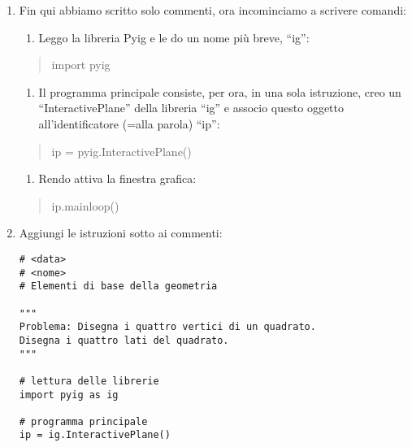 \begin{enumerate} [noitemsep]
A questo punto il programma assomiglierà a:

\begin{lstlisting}
# <data>
# <autore>
# Elementi di base della geometria

"""
Problema: Disegna i quattro vertici di un quadrato.
Disegna i quattro lati del quadrato.
"""

# lettura delle librerie

# programma principale

# attivazione della finestra grafica
\end{lstlisting}

\item Fin qui abbiamo scritto solo commenti, ora incominciamo a scrivere 
comandi:
\begin{enumerate} [noitemsep]
\item Leggo la libreria Pyig e le do un nome più breve, ``ig'':
\end{enumerate}
\begin{quote}
 import pyig
\end{quote}
\begin{enumerate} [noitemsep]
\item Il programma principale consiste, per ora, in una sola istruzione,
creo un ``InteractivePlane'' della libreria ``ig'' e associo questo
oggetto all'identificatore (=alla parola) ``ip'':

\end{enumerate}
\begin{quote}
ip = pyig.InteractivePlane()
\end{quote}
\begin{enumerate} [noitemsep]
\item Rendo attiva la finestra grafica:

\end{enumerate}
\begin{quote}
ip.mainloop()
\end{quote}

\item Aggiungi le istruzioni sotto ai commenti:

\begin{lstlisting}
# <data>
# <nome>
# Elementi di base della geometria

"""
Problema: Disegna i quattro vertici di un quadrato.
Disegna i quattro lati del quadrato.
"""

# lettura delle librerie
import pyig as ig

# programma principale
ip = ig.InteractivePlane()


\end{lstlisting}
\end{enumerate}
